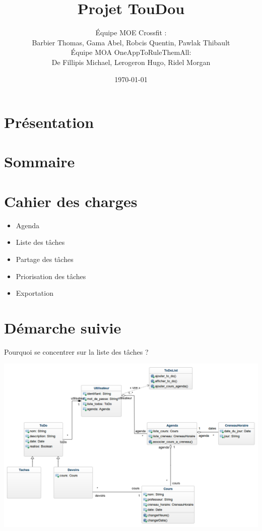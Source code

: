 \documentclass[french]{beamer}
\title{Projet TouDou}
\author{Équipe MOE Crossfit : \\Barbier Thomas, Gama Abel, Robcis Quentin, Pawlak Thibault \\
\vspace{0.5cm}
Équipe MOA OneAppToRuleThemAll: \\De Fillipis Michael, Lerogeron Hugo, Ridel Morgan }
\institute[]{INSA de Rouen}
\date{\today}
\begin{document}
\section{Présentation}
\begin{frame}
\titlepage
\end{frame}

\section{Sommaire}
\begin{frame}
\tableofcontents
\end{frame}

\section{Cahier des charges}
\begin{frame}
\begin{itemize}
  \item Agenda
  \item Liste des tâches
  \item Partage des tâches
  \item Priorisation des tâches
  \item Exportation
\end{itemize}
\end{frame}

\section{Démarche suivie}
\begin{frame}
  \begin{center}
    Pourquoi se concentrer sur la liste des tâches ?
  \begin{minipage}[c]{0.6\linewidth}%
   \includegraphics[width=1\linewidth]{mdd}  %
  \end{minipage}
\end{center}
\end{frame}
\end{document}
